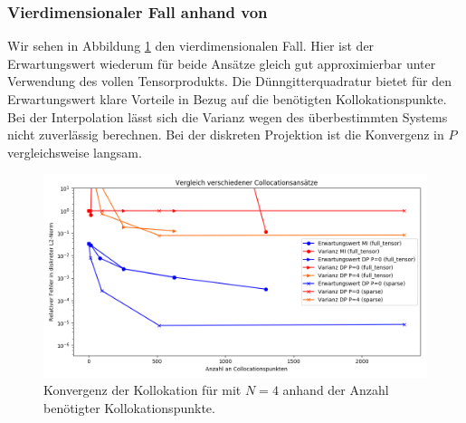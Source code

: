 \subsubsection*{Vierdimensionaler Fall anhand von }
Wir sehen in Abbildung \ref{fig:Kollokation_comparison_trial8} den vierdimensionalen Fall. Hier ist der Erwartungswert wiederum für beide Ansätze gleich gut approximierbar unter Verwendung des vollen Tensorprodukts. Die Dünngitterquadratur bietet für den Erwartungswert klare Vorteile in Bezug auf die benötigten Kollokationspunkte.\\
Bei der Interpolation lässt sich die Varianz wegen des überbestimmten Systems nicht zuverlässig berechnen. Bei der diskreten Projektion ist die Konvergenz in $P$ vergleichsweise langsam.
\begin{figure}[!htb]
\includegraphics[width=\textwidth]{Figures/collocation_midp_trial8.png}
\caption{Konvergenz der Kollokation für  mit $N=4$ anhand der Anzahl benötigter Kollokationspunkte.}
\label{fig:Kollokation_comparison_trial8}
\end{figure}

